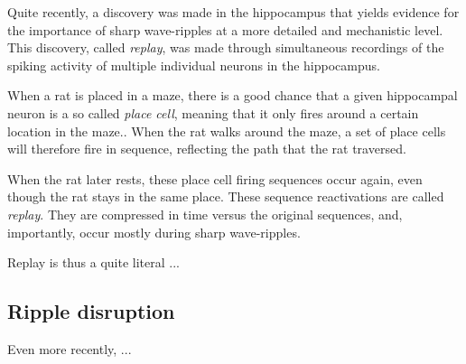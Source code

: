 Quite recently, a discovery was made in the hippocampus that yields evidence for the importance of sharp wave-ripples at a more detailed and mechanistic level. This discovery, called \emph{replay}, was made through simultaneous recordings of the spiking activity of multiple individual neurons in the hippocampus.\footnotemark{}


When a rat is placed in a maze, there is a good chance that a given hippocampal neuron is a so called \emph{place cell}, meaning that it only fires around a certain location in the maze.\footnotemark{}. When the rat walks around the maze, a set of place cells will therefore fire in sequence, reflecting the path that the rat traversed.


When the rat later rests, these place cell firing sequences occur again, even though the rat stays in the same place. These sequence reactivations are called \emph{replay}. They are compressed in time versus the original sequences, and, importantly, occur mostly during sharp wave-ripples.

Replay is thus a quite literal ...





\subsection{Ripple disruption}

Even more recently, ...

